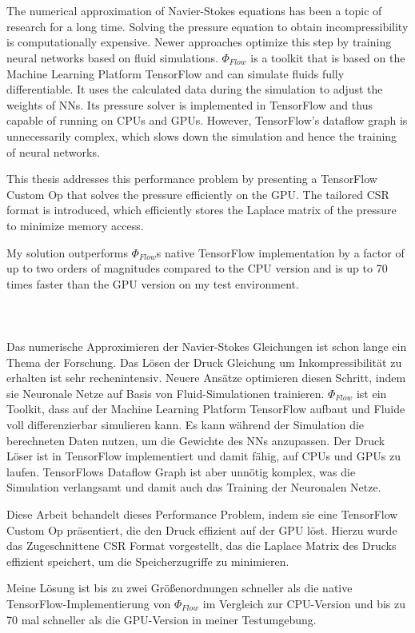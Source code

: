 \chapter{\abstractname}
\small
The numerical approximation of Navier-Stokes equations has been a topic of research for a long time. Solving the pressure equation to obtain incompressibility is computationally expensive. Newer approaches optimize this step by training neural networks based on fluid simulations. $\Phi_{Flow}$ is a toolkit that is based on the Machine Learning Platform TensorFlow and can simulate fluids fully differentiable. It uses the calculated data during the simulation to adjust the weights of NNs. Its pressure solver is implemented in TensorFlow and thus capable of running on CPUs and GPUs. However, TensorFlow's dataflow graph is unnecessarily complex, which slows down the simulation and hence the training of neural networks. 
\par This thesis addresses this performance problem by presenting a TensorFlow Custom Op that solves the pressure efficiently on the GPU. The tailored CSR format is introduced, which efficiently stores the Laplace matrix of the pressure to minimize memory access. 
\par My solution outperforms $\Phi_{Flow}$s native TensorFlow implementation by a factor of up to two orders of magnitudes compared to the CPU version and is up to 70 times faster than the GPU version on my test environment.\\\\\\\\
Das numerische Approximieren der Navier-Stokes Gleichungen ist schon lange ein Thema der Forschung. Das Lösen der Druck Gleichung um Inkompressibilität zu erhalten ist sehr rechenintensiv. Neuere Ansätze optimieren diesen Schritt, indem sie Neuronale Netze auf Basis von Fluid-Simulationen trainieren. $\Phi_{Flow}$ ist ein Toolkit, dass auf der Machine Learning Platform TensorFlow aufbaut und Fluide voll differenzierbar simulieren kann. Es kann während der Simulation die berechneten Daten nutzen, um die Gewichte des NNs anzupassen. Der Druck Löser ist in TensorFlow implementiert und damit fähig, auf CPUs und GPUs zu laufen. TensorFlows Dataflow Graph ist aber unnötig komplex, was die Simulation verlangsamt und damit auch das Training der Neuronalen Netze. 
\par Diese Arbeit behandelt dieses Performance Problem, indem sie eine TensorFlow Custom Op präsentiert, die den Druck effizient auf der GPU löst. Hierzu wurde das Zugeschnittene CSR Format vorgestellt, das die Laplace Matrix des Drucks effizient speichert, um die Speicherzugriffe zu minimieren. 
\par Meine Lösung ist bis zu zwei Größenordnungen schneller als die native TensorFlow-Implementierung von $\Phi_{Flow}$ im Vergleich zur CPU-Version und bis zu 70 mal schneller als die GPU-Version in meiner Testumgebung.

\normalsize